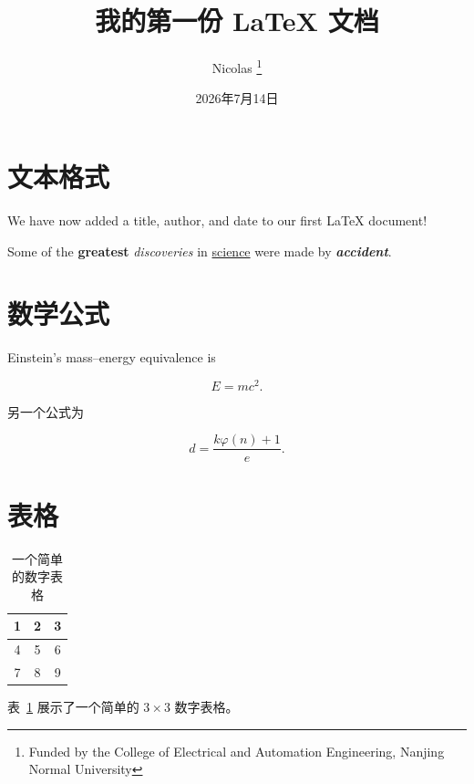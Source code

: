 \documentclass[UTF8,12pt,letterpaper]{ctexart}
\title{我的第一份 \LaTeX{} 文档}
\author{
  Nicolas%
  \thanks{Funded by the College of Electrical and Automation Engineering,
  Nanjing Normal University}
}
\date{2026年7月14日}
\begin{document}
\maketitle

\section{文本格式}

We have now added a title, author, and date to our first
\LaTeX{} document!


Some of the \textbf{greatest}
\emph{discoveries} in \underline{science}
were made by \textbf{\textit{accident}}.

\section{数学公式}

Einstein's mass--energy equivalence is

\[
E = mc^2.
\]

另一个公式为

\[
d = \frac{k\varphi(n)+1}{e}.
\]

\section{表格}

\begin{table}[htbp]
  \centering
  \caption{一个简单的数字表格}
  \label{tab:number-example}

  \begin{tabular}{|c|c|c|}
    \hline
    1 & 2 & 3 \\
    \hline
    4 & 5 & 6 \\
    \hline
    7 & 8 & 9 \\
    \hline
  \end{tabular}
\end{table}

表~\ref{tab:number-example} 展示了一个简单的 $3\times3$ 数字表格。
\end{document}
